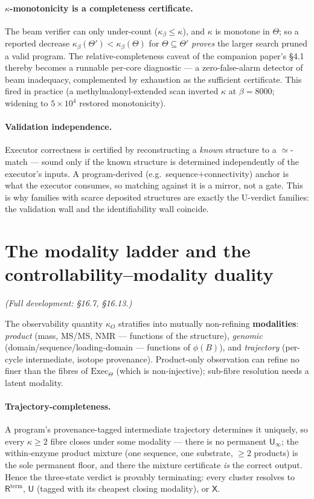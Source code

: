 \documentclass[11pt]{article}
\newcommand{\U}{\mathsf{U}}
\newcommand{\X}{\mathsf{X}}
\newcommand{\Rterm}{\mathsf{R}^{\mathrm{term}}}
\newcommand{\kO}{\kappa_{O}}
\begin{document}
\paragraph{$\kappa$-monotonicity is a completeness certificate.} The beam verifier can only under-count
($\kappa_\beta\le\kappa$), and $\kappa$ is monotone in $\Theta$; so a reported decrease
$\kappa_\beta(\Theta')<\kappa_\beta(\Theta)$ for $\Theta\subseteq\Theta'$ \emph{proves} the larger
search pruned a valid program. The relative-completeness caveat of the companion paper's \S4.1 thereby
becomes a runnable per-core diagnostic --- a zero-false-alarm detector of beam inadequacy, complemented
by exhaustion as the sufficient certificate. This fired in practice (a methylmalonyl-extended scan
inverted $\kappa$ at $\beta=8000$; widening to $5\!\times\!10^4$ restored monotonicity).

\paragraph{Validation independence.} Executor correctness is certified by reconstructing a \emph{known}
structure to a $\simeq$-match --- sound only if the known structure is determined independently of the
executor's inputs. A program-derived (e.g.\ sequence$+$connectivity) anchor is what the executor
consumes, so matching against it is a mirror, not a gate. This is why families with scarce deposited
structures are exactly the U-verdict families: the validation wall and the identifiability wall
coincide.

\section{The modality ladder and the controllability--modality duality}
\emph{(Full development: \S16.7, \S16.13.)}

The observability quantity $\kO$ stratifies into mutually non-refining \textbf{modalities}:
\emph{product} (mass, MS/MS, NMR --- functions of the structure), \emph{genomic}
(domain/sequence/loading-domain --- functions of $\phi(B)$), and \emph{trajectory} (per-cycle
intermediate, isotope provenance). Product-only observation can refine no finer than the fibres of
$\mathrm{Exec}_\Theta$ (which is non-injective); sub-fibre resolution needs a latent modality.

\paragraph{Trajectory-completeness.} A program's provenance-tagged intermediate trajectory determines
it uniquely, so every $\kappa\ge2$ fibre closes under some modality --- there is no permanent
$\U_\infty$; the within-enzyme product mixture (one sequence, one substrate, $\ge2$ products) is the
sole permanent floor, and there the mixture certificate \emph{is} the correct output. Hence the
three-state verdict is provably terminating: every cluster resolves to $\Rterm$, $\U$ (tagged with its
cheapest closing modality), or $\X$.
\end{document}
